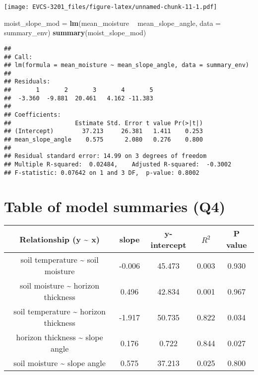 \documentclass[]{book}
\newenvironment{Shaded}{\begin{snugshade}}{\end{snugshade}}
\newcommand{\KeywordTok}[1]{\textcolor[rgb]{0.13,0.29,0.53}{\textbf{#1}}}
\newcommand{\DataTypeTok}[1]{\textcolor[rgb]{0.13,0.29,0.53}{#1}}
\newcommand{\StringTok}[1]{\textcolor[rgb]{0.31,0.60,0.02}{#1}}
\newcommand{\OperatorTok}[1]{\textcolor[rgb]{0.81,0.36,0.00}{\textbf{#1}}}
\newcommand{\NormalTok}[1]{#1}
\begin{document}
\begin{Shaded}
\end{Shaded}

\texttt{[image: EVCS-3201\_files/figure-latex/unnamed-chunk-11-1.pdf]}

\begin{Shaded}
\begin{Highlighting}[]
\NormalTok{moist_slope_mod =}\StringTok{ }\KeywordTok{lm}\NormalTok{(mean_moisture }\OperatorTok{~}\StringTok{ }\NormalTok{mean_slope_angle, }\DataTypeTok{data =}\NormalTok{ summary_env)}
\KeywordTok{summary}\NormalTok{(moist_slope_mod)}
\end{Highlighting}
\end{Shaded}

\begin{verbatim}
## 
## Call:
## lm(formula = mean_moisture ~ mean_slope_angle, data = summary_env)
## 
## Residuals:
##       1       2       3       4       5 
##  -3.360  -9.881  20.461   4.162 -11.383 
## 
## Coefficients:
##                  Estimate Std. Error t value Pr(>|t|)
## (Intercept)        37.213     26.381   1.411    0.253
## mean_slope_angle    0.575      2.080   0.276    0.800
## 
## Residual standard error: 14.99 on 3 degrees of freedom
## Multiple R-squared:  0.02484,    Adjusted R-squared:  -0.3002 
## F-statistic: 0.07642 on 1 and 3 DF,  p-value: 0.8002
\end{verbatim}

\section{Table of model summaries
(Q4)}\label{table-of-model-summaries-q4}

\begin{longtable}[]{@{}ccccc@{}}
\toprule
Relationship (y \textasciitilde{} x) & slope & y-intercept & \(R^2\) & P
value\tabularnewline
\midrule
\endhead
soil temperature \textasciitilde{} soil moisture & -0.006 & 45.473 &
0.003 & 0.930\tabularnewline
soil moisture \textasciitilde{} horizon thickness & 0.496 & 42.834 &
0.001 & 0.967\tabularnewline
soil temperature \textasciitilde{} horizon thickness & -1.917 & 50.735 &
0.822 & 0.034\tabularnewline
horizon thickness \textasciitilde{} slope angle & 0.176 & 0.722 & 0.844
& 0.027\tabularnewline
soil moisture \textasciitilde{} slope angle & 0.575 & 37.213 & 0.025 &
0.800\tabularnewline
\bottomrule
\end{longtable}
\end{document}

